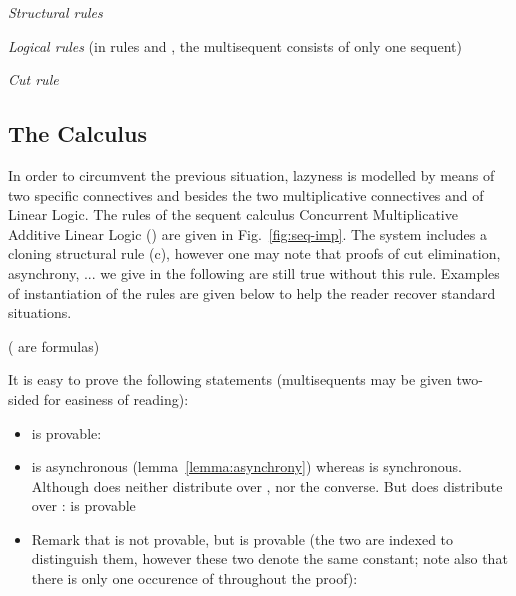 \documentclass{llncs}
\begin{document}
\begin{Fig.}
{\em Structural rules}


{\em Logical rules} (in rules  and , the multisequent consists of only one sequent)


{\em Cut rule}

\caption{Sequent calculus for a bad lazy MLL.  in rules.}\label{badCLL}
\end{Fig.}

\subsection{The Calculus \CMALL}

In order to circumvent the previous situation, lazyness is modelled by means of two specific connectives  and  besides the two multiplicative connectives  and  of Linear Logic. The rules of the sequent calculus Concurrent Multiplicative Additive Linear Logic (\CMALL) are given in Fig.~\ref{fig:seq-imp}. The system includes a cloning structural rule (c), however one may note that proofs of cut elimination, asynchrony, ... we give in the following are still true without this rule. Examples of instantiation of the rules are given below to help the reader recover standard situations.


\begin{example}
( are formulas)\\

\end{example}

It is easy to prove the following statements (multisequents may be given two-sided for easiness of reading):
\begin{itemize}
\item  is provable:\vspace*{-3mm}\\
\centerline{}

\item   is asynchronous (lemma~\ref{lemma:asynchrony}) whereas  is synchronous. Although  does neither distribute over , nor the converse. But  does distribute over :  is provable\vspace*{1mm}\\
\hspace*{-2cm}
	
	


\item 
Remark that  is not provable, but  is provable (the two  are indexed to distinguish 
them, however these two denote the same constant; note also that there is 
only one occurence of  throughout the proof):
\vspace{-.4cm}

\end{itemize}
\end{document}
